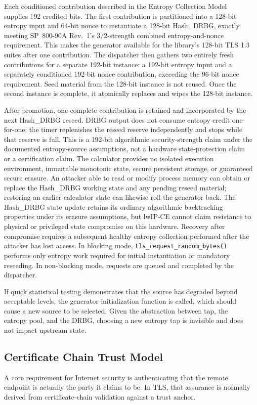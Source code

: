 \documentclass[titlepage]{report}
\begin{document}
		Each conditioned contribution described in the Entropy Collection Model supplies 192 credited bits. The first contribution is partitioned into a 128-bit entropy input and 64-bit nonce to instantiate a 128-bit Hash\_DRBG, exactly meeting SP~800-90A Rev.~1's $3/2$-strength combined entropy-and-nonce requirement. This makes the generator available for the library's 128-bit TLS 1.3 suites after one contribution. The dispatcher then gathers two entirely fresh contributions for a separate 192-bit instance: a 192-bit entropy input and a separately conditioned 192-bit nonce contribution, exceeding the 96-bit nonce requirement. Seed material from the 128-bit instance is not reused. Once the second instance is complete, it atomically replaces and wipes the 128-bit instance.

		After promotion, one complete contribution is retained and incorporated by the next Hash\_DRBG reseed. DRBG output does not consume entropy credit one-for-one; the timer replenishes the reseed reserve independently and stops while that reserve is full.
		This is a 192-bit algorithmic security-strength claim under the documented entropy-source assumptions, not a hardware state-protection claim or a certification claim. The calculator provides no isolated execution environment, immutable monotonic state, secure persistent storage, or guaranteed secure erasure. An attacker able to read or modify process memory can obtain or replace the Hash\_DRBG working state and any pending reseed material; restoring an earlier calculator state can likewise roll the generator back. The Hash\_DRBG state update retains its ordinary algorithmic backtracking properties under its erasure assumptions, but lwIP-CE cannot claim resistance to physical or privileged state compromise on this hardware. Recovery after compromise requires a subsequent healthy entropy collection performed after the attacker has lost access.
		In blocking mode, \texttt{tls\_request\_random\_bytes()} performs only entropy work required for initial instantiation or mandatory reseeding. In non-blocking mode, requests are queued and completed by the dispatcher.
		
		If quick statistical testing demonstrates that the source has degraded beyond acceptable levels, the generator initialization function is called, which should cause a new source to be selected. Given the abstraction between tap, the entropy pool, and the DRBG, choosing a new entropy tap is invisible and does not impact upstream state.

	\subsection{Certificate Chain Trust Model}
	A core requirement for Internet security is authenticating that the remote endpoint is actually the party it claims to be. In TLS, that assurance is normally derived from certificate-chain validation against a trust anchor.
	
\end{document}
